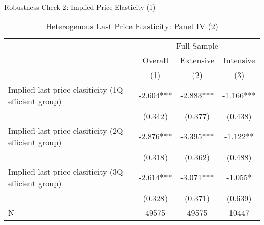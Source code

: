 \documentclass[
  ignorenonframetext,
]{beamer}
\begin{document}
\begin{frame}{Robustness Check 2: Implied Price Elasticity (1)}
\protect\hypertarget{robustness-check-2-implied-price-elasticity-1}{}
\begin{table}

\caption{\label{tab:kableHeteroLastElasticitySlide2}Heterogenous Last Price Elasticity: Panel IV (2)}
\centering
\fontsize{8}{10}\selectfont
\begin{tabular}[t]{lccc}
\toprule
\multicolumn{1}{c}{ } & \multicolumn{3}{c}{Full Sample} \\
\cmidrule(l{3pt}r{3pt}){2-4}
\multicolumn{1}{c}{ } & \multicolumn{1}{c}{Overall} & \multicolumn{1}{c}{Extensive} & \multicolumn{1}{c}{Intensive} \\
\cmidrule(l{3pt}r{3pt}){2-2} \cmidrule(l{3pt}r{3pt}){3-3} \cmidrule(l{3pt}r{3pt}){4-4}
 & (1) & (2) & (3)\\
\midrule
Implied last price elasiticity (1Q efficient group) & -2.604*** & -2.883*** & -1.166***\\
 & (0.342) & (0.377) & (0.438)\\
Implied last price elasiticity (2Q efficient group) & -2.876*** & -3.395*** & -1.122**\\
 & (0.318) & (0.362) & (0.488)\\
Implied last price elasiticity (3Q efficient group) & -2.614*** & -3.071*** & -1.055*\\
 & (0.328) & (0.371) & (0.639)\\
N & 49575 & 49575 & 10447\\
\bottomrule
\end{tabular}
\end{table}
\end{frame}
\end{document}
